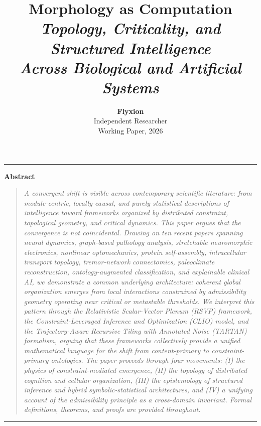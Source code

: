 \documentclass[11pt, oneside]{article}
\title{%
  \vspace{-0.5cm}
  {\fontsize{26}{30}\selectfont\bfseries\color{rsvpblue} Morphology as Computation}\\[0.6em]
  {\large\color{rsvpgray}\itshape Topology, Criticality, and Structured Intelligence\\[0.15em]
  Across Biological and Artificial Systems}\\[0.8em]
}
\author{%
  \textbf{Flyxion}\\
  \small Independent Researcher\\[0.3em]
  \small\textcolor{rsvpgray}{Working Paper, 2026}
}
\date{}
\numberwithin{equation}{section}
\theoremstyle{rsvpstyle}
\theoremstyle{remark}
\begin{document}
\maketitle
\thispagestyle{empty}

\vspace{-0.3cm}
\begin{center}
  \textcolor{rsvpblue!50}{\rule{0.6\linewidth}{0.5pt}}
\end{center}
\vspace{0.1cm}

\begin{center}
  \textbf{\small Abstract}
\end{center}
\begin{quote}
\small\itshape
A convergent shift is visible across contemporary scientific literature: from
module-centric, locally-causal, and purely statistical descriptions of intelligence toward
frameworks organized by distributed constraint, topological geometry, and critical
dynamics. This paper argues that the convergence is not coincidental. Drawing on ten
recent papers spanning neural dynamics, graph-based pathology analysis, stretchable
neuromorphic electronics, nonlinear optomechanics, protein self-assembly, intracellular
transport topology, tremor-network connectomics, paleoclimate reconstruction, ontology-augmented
classification, and explainable clinical AI, we demonstrate a common underlying
architecture: coherent global organization emerges from local interactions constrained by
admissibility geometry operating near critical or metastable thresholds. We interpret
this pattern through the Relativistic Scalar-Vector Plenum (RSVP) framework, the
Constraint-Leveraged Inference and Optimization (CLIO) model, and the
Trajectory-Aware Recursive Tiling with Annotated Noise (TARTAN) formalism,
arguing that these frameworks collectively provide a unified mathematical language for
the shift from content-primary to constraint-primary ontologies. The paper proceeds
through four movements: (I) the physics of constraint-mediated emergence, (II) the
topology of distributed cognition and cellular organization, (III) the epistemology of
structured inference and hybrid symbolic-statistical architectures, and (IV) a unifying
account of the admissibility principle as a cross-domain invariant. Formal definitions,
theorems, and proofs are provided throughout.
\end{quote}

\vspace{0.2cm}
\begin{center}
  \textcolor{rsvpblue!50}{\rule{0.6\linewidth}{0.5pt}}
\end{center}
\end{document}
